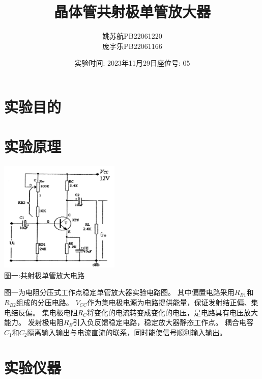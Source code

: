 \documentclass[a4paper]{article}
\title{\textbf{晶体管共射极单管放大器}}
\author{姚苏航\qquad PB22061220 \\ 庞宇乐\qquad PB22061166}
\date{实验时间: 2023年11月29日\qquad 座位号: 05}
\begin{document}
    \maketitle


    \vspace{1cm}


    \section{实验目的\cite{ed4}}\label{sec:}





    \vspace{1cm}


    \section{实验原理}\label{sec:10}
    \begin{center}
        \includegraphics[height=150pt]{AC}\\
        {\small 图一:共射极单管放大电路}
    \end{center}

    {{图一为电阻分压式工作点稳定单管放大器实验电路图。
    其中偏置电路采用$R_{B1}$和$R_{B2}$组成的分压电路。
    $V_{CC}$作为集电极电源为电路提供能量，保证发射结正偏、集电结反偏。
    集电极电阻$R_C$将变化的电流转变成变化的电压，是电路具有电压放大能力。
    发射极电阻$R_E$引入负反馈稳定电路，稳定放大器静态工作点。
    耦合电容$C_1$和$C_2$隔离输入输出与电流直流的联系，同时能使信号顺利输入输出。}}


    \vspace{1cm}


    \section{实验仪器}\label{sec:2}
\end{document}
